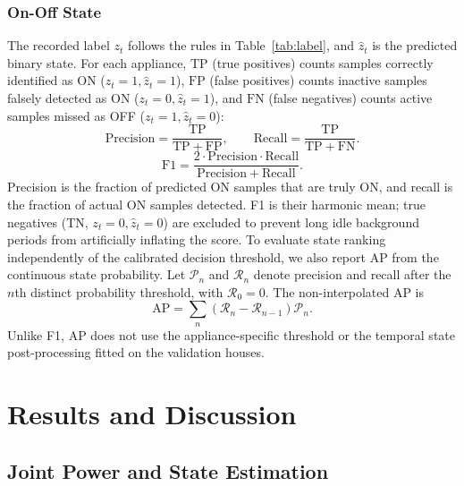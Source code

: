 \documentclass[journal]{IEEEtran}
\begin{document}
\subsubsection{On-Off State}
The recorded label $z_t$ follows the rules in Table~\ref{tab:label}, and $\hat{z}_t$ is the predicted binary state. For each appliance, $\mathrm{TP}$ (true positives) counts samples correctly identified as ON ($z_t=1, \hat{z}_t=1$), $\mathrm{FP}$ (false positives) counts inactive samples falsely detected as ON ($z_t=0, \hat{z}_t=1$), and $\mathrm{FN}$ (false negatives) counts active samples missed as OFF ($z_t=1, \hat{z}_t=0$):
\begin{equation}
\mathrm{Precision}=\frac{\mathrm{TP}}{\mathrm{TP}+\mathrm{FP}},\qquad
\mathrm{Recall}=\frac{\mathrm{TP}}{\mathrm{TP}+\mathrm{FN}}.
\label{eq:precision}
\end{equation}
\begin{equation}
\mathrm{F1}=\frac{2\cdot\mathrm{Precision}\cdot\mathrm{Recall}}{\mathrm{Precision}+\mathrm{Recall}}.
\label{eq:f1}
\end{equation}
Precision is the fraction of predicted ON samples that are truly ON, and recall is the fraction of actual ON samples detected. F1 is their harmonic mean; true negatives ($\mathrm{TN}$, $z_t=0, \hat{z}_t=0$) are excluded to prevent long idle background periods from artificially inflating the score.
To evaluate state ranking independently of the calibrated decision threshold, we also report AP from the continuous state probability. Let $\mathcal{P}_n$ and $\mathcal{R}_n$ denote precision and recall after the $n$th distinct probability threshold, with $\mathcal{R}_0=0$. The non-interpolated AP is
\begin{equation}
\mathrm{AP}=\sum_n\left(\mathcal{R}_n-\mathcal{R}_{n-1}\right)\mathcal{P}_n.
\label{eq:average-precision}
\end{equation}
Unlike F1, AP does not use the appliance-specific threshold or the temporal state post-processing fitted on the validation houses.

\section{Results and Discussion}

\subsection{Joint Power and State Estimation}
\label{sec:power-state}
\end{document}
